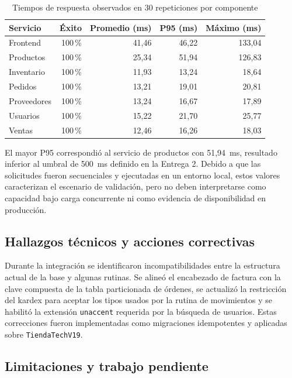 \documentclass[12pt]{article}
\begin{document}
    \begin{table}[H]
        \centering
        \caption{Tiempos de respuesta observados en 30 repeticiones por componente}
        \label{tab:metricas_e3}
        \small
        \begin{tabular}{lrrrr}
            \toprule
            \textbf{Servicio} & \textbf{Éxito} & \textbf{Promedio (ms)} & \textbf{P95 (ms)} & \textbf{Máximo (ms)} \\
            \midrule
            Frontend & 100\,\% & 41,46 & 46,22 & 133,04 \\
            Productos & 100\,\% & 25,34 & 51,94 & 126,83 \\
            Inventario & 100\,\% & 11,93 & 13,24 & 18,64 \\
            Pedidos & 100\,\% & 13,21 & 19,01 & 20,81 \\
            Proveedores & 100\,\% & 13,24 & 16,67 & 17,89 \\
            Usuarios & 100\,\% & 15,22 & 21,70 & 25,77 \\
            Ventas & 100\,\% & 12,46 & 16,26 & 18,03 \\
            \bottomrule
        \end{tabular}
    \end{table}

    El mayor P95 correspondió al servicio de productos con 51,94~ms, resultado inferior al umbral de 500~ms definido en la Entrega 2. Debido a que las solicitudes fueron secuenciales y ejecutadas en un entorno local, estos valores caracterizan el escenario de validación, pero no deben interpretarse como capacidad bajo carga concurrente ni como evidencia de disponibilidad en producción.

    \subsection{Hallazgos técnicos y acciones correctivas}

    Durante la integración se identificaron incompatibilidades entre la estructura actual de la base y algunas rutinas. Se alineó el encabezado de factura con la clave compuesta de la tabla particionada de órdenes, se actualizó la restricción del kardex para aceptar los tipos usados por la rutina de movimientos y se habilitó la extensión \texttt{unaccent} requerida por la búsqueda de usuarios. Estas correcciones fueron implementadas como migraciones idempotentes y aplicadas sobre \texttt{TiendaTechV19}.

    \subsection{Limitaciones y trabajo pendiente}
\end{document}
